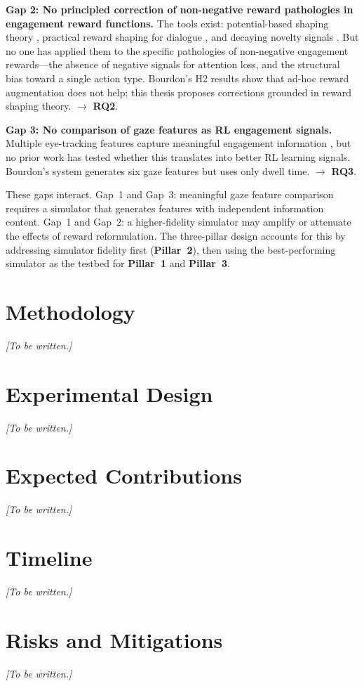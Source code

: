 \documentclass[a4paper, 11pt]{article}
\newcommand{\pillar}[1]{\textbf{Pillar~#1}}
\newcommand{\researchq}[1]{\textbf{RQ#1}}
\begin{document}
\textbf{Gap 2: No principled correction of non-negative reward pathologies in engagement reward functions.} The tools exist: potential-based shaping theory \citep{ng1999policy}, practical reward shaping for dialogue \citep{su2015reward}, and decaying novelty signals \citep{pathak2017curiosity}. But no one has applied them to the specific pathologies of non-negative engagement rewards---the absence of negative signals for attention loss, and the structural bias toward a single action type. Bourdon's H2 results show that ad-hoc reward augmentation does not help; this thesis proposes corrections grounded in reward shaping theory. $\to$ \researchq{2}.

\textbf{Gap 3: No comparison of gaze features as RL engagement signals.} Multiple eye-tracking features capture meaningful engagement information \citep{milekic2025museum,clare2024}, but no prior work has tested whether this translates into better RL learning signals. Bourdon's system generates six gaze features but uses only dwell time. $\to$ \researchq{3}.

These gaps interact. Gap~1 and Gap~3: meaningful gaze feature comparison requires a simulator that generates features with independent information content. Gap~1 and Gap~2: a higher-fidelity simulator may amplify or attenuate the effects of reward reformulation. The three-pillar design accounts for this by addressing simulator fidelity first (\pillar{2}), then using the best-performing simulator as the testbed for \pillar{1} and \pillar{3}.

\section{Methodology}
\label{sec:methodology}
\textit{[To be written.]}

\section{Experimental Design}
\label{sec:experiments}
\textit{[To be written.]}

\section{Expected Contributions}
\label{sec:contributions}
\textit{[To be written.]}

\section{Timeline}
\label{sec:timeline}
\textit{[To be written.]}

\section{Risks and Mitigations}
\label{sec:risks}
\textit{[To be written.]}

\newpage

\end{document}
